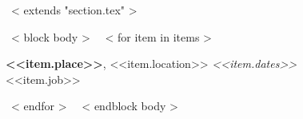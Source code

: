 ~< extends "section.tex" >~

~< block body >~
~< for item in items >~

    {\bf <<item.place>>}, <<item.location>> \hfill {\it <<item.dates>> } \\
    {<<item.job>>}

~< endfor >~
~< endblock body >~

